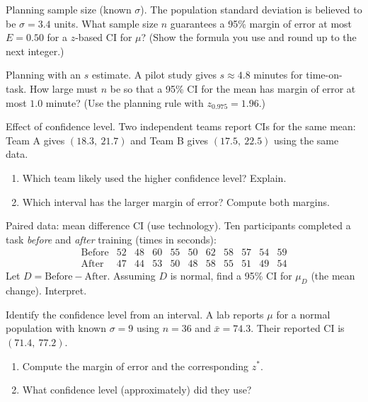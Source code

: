 \documentclass[11pt]{article}
\def\textbf#1{#1}%
\newcounter{question}
\begin{document}
\begin{question}
\textbf{Planning sample size (known $\sigma$).}
The population standard deviation is believed to be $\sigma=3.4$ units. 
What sample size $n$ guarantees a 95\% margin of error at most $E=0.50$ for a $z$-based CI for $\mu$?
(Show the formula you use and round up to the next integer.)
\end{question}

\begin{question}
\textbf{Planning with an $s$ estimate.}
A pilot study gives $s\approx 4.8$ minutes for time-on-task. 
How large must $n$ be so that a 95\% CI for the mean has margin of error at most $1.0$ minute?
(Use the planning rule with $z_{0.975}=1.96$.)
\end{question}

\begin{question}
\textbf{Effect of confidence level.}
Two independent teams report CIs for the same mean: Team A gives $(18.3,\ 21.7)$ and Team B gives $(17.5,\ 22.5)$ using the same data.
\begin{enumerate}
  \item Which team likely used the higher confidence level? Explain.
  \item Which interval has the larger margin of error? Compute both margins.
\end{enumerate}
\end{question}

\begin{question}
\textbf{Paired data: mean difference CI (use technology).}
Ten participants completed a task \emph{before} and \emph{after} training (times in seconds):
\[
\begin{array}{c|cccccccccc}
\text{Before} & 52&48&60&55&50&62&58&57&54&59\\
\text{After}  & 47&44&53&50&48&58&55&51&49&54
\end{array}
\]
Let $D=\text{Before}-\text{After}$. Assuming $D$ is normal, find a 95\% CI for $\mu_D$ (the mean change). Interpret.
\end{question}

\begin{question}
\textbf{Identify the confidence level from an interval.}
A lab reports $\mu$ for a normal population with known $\sigma=9$ using $n=36$ and $\bar x=74.3$. 
Their reported CI is $(71.4,\ 77.2)$. 
\begin{enumerate}
  \item Compute the margin of error and the corresponding $z^{\ast}$.
  \item What confidence level (approximately) did they use?
\end{enumerate}
\end{question}
\end{document}
